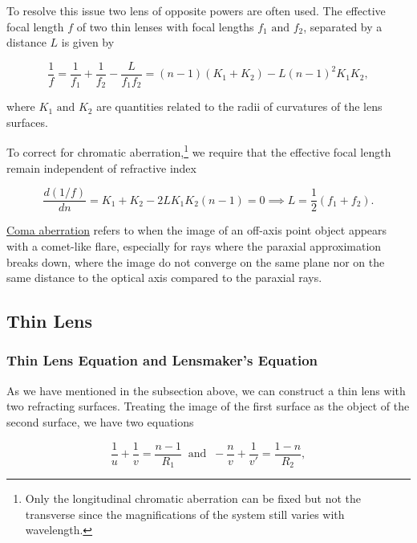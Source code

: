 \documentclass[english,a4paper,12pt]{report}
\begin{document}

To resolve this issue two lens of opposite powers are often used. The effective focal length \(f\) of two thin lenses with focal lengths \(f_1 \text { and } f_2 \), separated by a distance \(L\) is given by 

\begin{equation}
    \frac{1}{f} = \frac{1}{f_1 } + \frac{1}{f_2 } - \frac{L}{f_1 f_2 } = (n-1)(K_1 +K_2 ) - L(n-1)^2K_1 K_2,
\end{equation}

where \(K_1 \text { and } K_2 \) are quantities related to the radii of curvatures of the lens surfaces.

To correct for chromatic aberration,\footnote{Only the longitudinal chromatic aberration can be fixed but not the transverse since the magnifications of the system still varies with wavelength.} we require that the effective focal length remain independent of refractive index

\begin{equation}
    \frac{d(1 /f)}{dn} = K_1 + K_2 - 2LK_1 K_2 (n-1) = 0 \implies L = \frac{1}{2}(f_1 +f_2 ).  
\end{equation}

\href{http:////hyperphysics.phy-astr.gsu.edu//hbase//geoopt//coma.html\#c1}{Coma aberration} refers to when the image of an off-axis point object appears with a comet-like flare, especially for rays where the paraxial approximation breaks down, where the image do not converge on the same plane nor on the same distance to the optical axis compared to the paraxial rays.




\subsection{Thin Lens}

\subsubsection{Thin Lens Equation and Lensmaker's Equation}

As we have mentioned in the subsection above, we can construct a thin lens with two refracting surfaces. Treating the image of the first surface as the object of the second surface, we have two equations

\begin{equation}
    \frac{1}{u} + \frac{1}{v} = \frac{n-1}{R_1 } ~\text { and }~ -\frac{n}{v} + \frac{1}{v'} = \frac{1-n}{R_2 },  
\end{equation}
\end{document}
